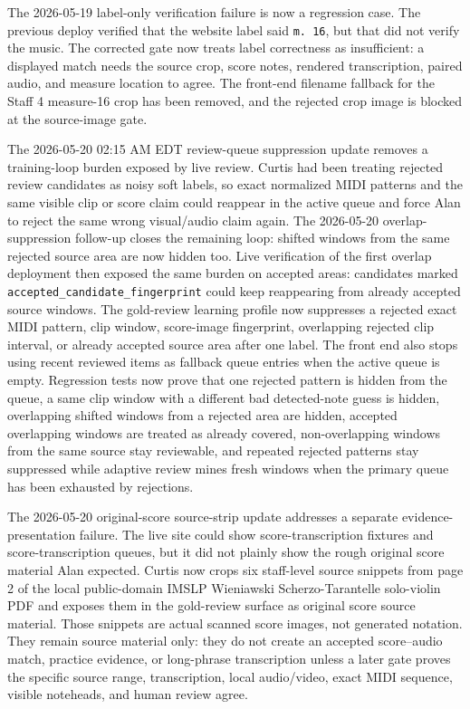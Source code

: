 The 2026-05-19 label-only verification failure is now a regression case. The previous deploy verified that the website label said \texttt{m. 16}, but that did not verify the music. The corrected gate now treats label correctness as insufficient: a displayed match needs the source crop, score notes, rendered transcription, paired audio, and measure location to agree. The front-end filename fallback for the Staff 4 measure-16 crop has been removed, and the rejected crop image is blocked at the source-image gate.

The 2026-05-20 02:15 AM EDT review-queue suppression update removes a training-loop burden exposed by live review. Curtis had been treating rejected review candidates as noisy soft labels, so exact normalized MIDI patterns and the same visible clip or score claim could reappear in the active queue and force Alan to reject the same wrong visual/audio claim again. The 2026-05-20 overlap-suppression follow-up closes the remaining loop: shifted windows from the same rejected source area are now hidden too. Live verification of the first overlap deployment then exposed the same burden on accepted areas: candidates marked \texttt{accepted\_candidate\_fingerprint} could keep reappearing from already accepted source windows. The gold-review learning profile now suppresses a rejected exact MIDI pattern, clip window, score-image fingerprint, overlapping rejected clip interval, or already accepted source area after one label. The front end also stops using recent reviewed items as fallback queue entries when the active queue is empty. Regression tests now prove that one rejected pattern is hidden from the queue, a same clip window with a different bad detected-note guess is hidden, overlapping shifted windows from a rejected area are hidden, accepted overlapping windows are treated as already covered, non-overlapping windows from the same source stay reviewable, and repeated rejected patterns stay suppressed while adaptive review mines fresh windows when the primary queue has been exhausted by rejections.

The 2026-05-20 original-score source-strip update addresses a separate evidence-presentation failure. The live site could show score-transcription fixtures and score-transcription queues, but it did not plainly show the rough original score material Alan expected. Curtis now crops six staff-level source snippets from page 2 of the local public-domain IMSLP Wieniawski Scherzo-Tarantelle solo-violin PDF and exposes them in the gold-review surface as original score source material. Those snippets are actual scanned score images, not generated notation. They remain source material only: they do not create an accepted score--audio match, practice evidence, or long-phrase transcription unless a later gate proves the specific source range, transcription, local audio/video, exact MIDI sequence, visible noteheads, and human review agree.

